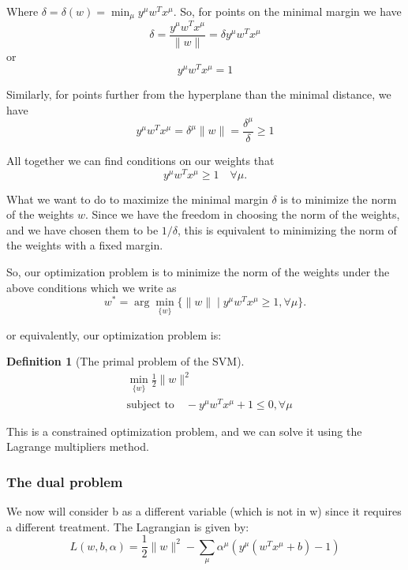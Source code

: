 \documentclass[11pt]{book} %
\newtheorem{definition}{Definition}[section]
\begin{document}
Where \( \delta = \delta(w) = \min_{\mu} y^{\mu}w^T x^{\mu} \). So, for points on the minimal margin we have
\begin{equation}
    \delta = \frac{y^{\mu}w^T x^{\mu}}{\lVert w \rVert} = \delta y^{\mu}w^T x^{\mu}  
\end{equation}
or
\begin{equation}
    y^{\mu}w^T x^{\mu} = 1 
\end{equation}

Similarly, for points further from the hyperplane than the minimal distance, we have
\begin{equation}
    y^{\mu}w^T x^{\mu} =  \delta ^{\mu}  \lVert w \rVert = \frac{\delta^{\mu}}{\delta} \geq 1
\end{equation}

All together we can find conditions on our weights that
\begin{equation}
    y^{\mu}w^T x^{\mu} \geq 1 \quad \forall \mu.  
\end{equation}

What we want to do to maximize the minimal margin \( \delta \) is to minimize the norm of the weights \( w \). 
Since we have the freedom in choosing the norm of the weights, and we have chosen them to be \( 1/\delta \), this is equivalent to minimizing the norm of the weights with a fixed margin.

So, our optimization problem is to minimize the norm of the weights under the above conditions which we write as
\begin{equation}
    w^* = \arg \min_{\{w\}} \{ \lVert w \rVert \mid y^{\mu}w^T x^{\mu} \geq 1, \forall \mu \}. 
\end{equation}

or equivalently, our optimization problem is:
\begin{definition}[The primal problem of the SVM]
    \begin{align*}
        &\min_{\{w\}} \frac{1}{2} \lVert w \rVert^2 \\
        &\text{subject to} \quad  -y^{\mu}w^T x^{\mu} + 1 \leq 0, \forall \mu
    \end{align*}
\end{definition}




This is a constrained optimization problem, and we can solve it using the Lagrange multipliers method.

%
%

\subsubsection{The dual problem}
We now will consider b as a different variable (which is not in w) since it requires a different treatment.
The Lagrangian is given by:
\begin{equation}
    L(w, b, \alpha) = \frac{1}{2} \lVert w \rVert^2 - \sum_{\mu} \alpha^{\mu} (y^{\mu}(w^T x^{\mu} + b) - 1)
\end{equation}
\end{document}
